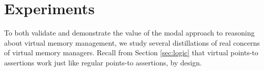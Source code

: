 \section{Experiments}
\label{sec:experiment}
To both validate and demonstrate the value of the modal approach to reasoning about virtual memory management, we study several
distillations of real concerns of virtual memory managers.
Recall from Section \ref{sec:logic} that virtual points-to assertions work just like regular points-to assertions, by design.

